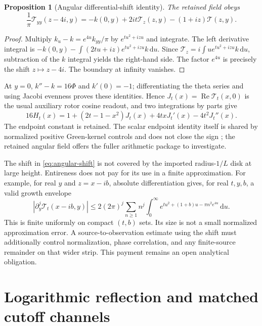\documentclass[11pt]{article}
\newtheorem{proposition}[theorem]{Proposition}
\theoremstyle{definition}
\theoremstyle{remark}
\newcommand{\dd}{\,\mathrm d}
\newcommand{\Rea}{\operatorname{Re}}
\begin{document}
\begin{proposition}[Angular differential-shift identity]
\label{prop:angular-shift}
The retained field obeys
\begin{equation}
 \frac1\pi\mathcal T_{yy}(z-4i,y)
 =-k(0,y)+2it\mathcal T_z(z,y)-(1+iz)\mathcal T(z,y).
 \label{eq:angular-shift}
\end{equation}
\end{proposition}
\begin{proof}
Multiply $k_u-k=e^{4u}k_{yy}/\pi$ by $e^{tu^2+izu}$ and integrate.
The left derivative integral is
$-k(0,y)-\int(2tu+iz)e^{tu^2+izu}k\dd u$.
Since $\mathcal T_z=i\int u e^{tu^2+izu}k\dd u$, subtraction of the
$k$ integral yields the right-hand side. The factor $e^{4u}$ is precisely
the shift $z\mapsto z-4i$. The boundary at infinity vanishes.
\end{proof}

At $y=0$, $k''-k=16\Phi$ and $k'(0)=-1$; differentiating the theta
series and using Jacobi evenness proves these identities. Hence
$J_t(x)=\Rea\mathcal T_t(x,0)$ is the usual auxiliary rotor cosine
readout, and two integrations by parts give
\begin{equation}
 16H_t(x)=1+(2t-1-x^2)J_t(x)+4txJ_t'(x)-4t^2J_t''(x).
 \label{eq:affine-ward}
\end{equation}
The endpoint constant is retained. The scalar endpoint identity itself
is shared by normalized positive Green-kernel controls and does not close
the sign \cite{thetanotes}; the retained angular field offers the fuller
arithmetic package to investigate.

The shift in \eqref{eq:angular-shift} is not covered by the imported
radius-$1/L$ disk at large height. Entireness does not pay for its use in
a finite approximation. For example, for real $y$ and $z=x-ib$,
absolute differentiation gives, for real $t,y,b$, a valid growth envelope
\begin{equation}
 |\partial_y^j\mathcal T_t(x-ib,y)|
 \le2(2\pi)^j\sum_{n\ge1}n^j
       \int_0^\infty e^{tu^2+(1+b)u-\pi n^2e^{4u}}\dd u.
 \label{eq:angular-growth}
\end{equation}
This is finite uniformly on compact $(t,b)$ sets. Its size is not a
small normalized approximation error. A source-to-observation estimate
using the shift must additionally control normalization, phase correlation,
and any finite-source remainder on that wider strip. This payment remains
an open analytical obligation.

\section{Logarithmic reflection and matched cutoff channels}
\label{sec:reflection}
\end{document}
